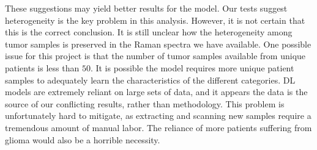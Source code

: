 These suggestions may yield better results for the model. Our tests suggest heterogeneity is the key problem in this analysis. However, it is not certain that this is the correct conclusion. It is still unclear how the heterogeneity among tumor samples is preserved in the Raman spectra we have available. One possible issue for this project is that the number of tumor samples available from unique patients is less than $50$. It is possible the model requires more unique patient samples to adequately learn the characteristics of the different categories. DL models are extremely reliant on large sets of data, and it appears the data is the source of our conflicting results, rather than methodology. This problem is unfortunately hard to mitigate, as extracting and scanning new samples require a tremendous amount of manual labor. The reliance of more patients suffering from glioma would also be a horrible necessity.